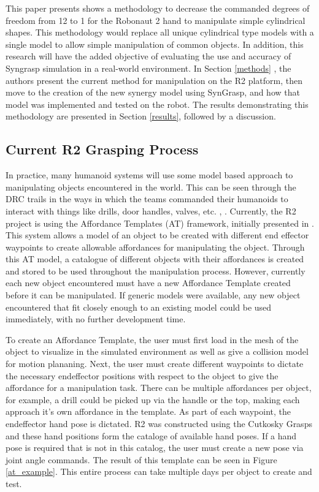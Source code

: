 \documentclass[letterpaper, 10 pt, conference]{ieeeconf}  %
\begin{document}
This paper presents shows a methodology to decrease the commanded degrees of freedom from 12 to 1 for the Robonaut 2 hand to manipulate simple cylindrical shapes. This methodology would replace all unique cylindrical type models with a single model to allow simple manipulation of common objects. In addition, this research will have the added objective of evaluating the use and accuracy of Syngrasp simulation in a real-world environment. In Section \ref{methods} , the authors present the current method for manipulation on the R2 platform, then move to the creation of the new synergy model using SynGrasp, and how that model was implemented and tested on the robot. The results demonstrating this methodology are presented in Section \ref{results}, followed by a discussion. 


\subsection{Current R2 Grasping Process}

In practice, many humanoid systems will use some model based approach to manipulating objects encountered in the world. This can be seen through the DRC trails in the ways in which the teams commanded their humanoids to interact with things like drills, door handles, valves, etc. \cite{DRC_Yanco}, \cite{IHMC}. Currently, the R2 project is using the Affordance Templates (AT) framework, initially presented in \cite{affordance_templates}. This system allows a model of an object to be created with different end effector waypoints to create allowable affordances for manipulating the object. Through this AT model, a catalogue of different objects with their affordances is created and stored to be used throughout the manipulation process. However, currently each new object encountered must have a new Affordance Template created before it can be manipulated. If generic models were available, any new object encountered that fit closely enough to an existing model could be used immediately, with no further development time. 

To create an Affordance Template, the user must first load in the mesh of the object to visualize in the simulated environment as well as give a collision model for motion plananing. Next, the user must create different waypoints to dictate the necessary endeffector positions with respect to the object to give the affordance for a manipulation task. There can be multiple affordances per object, for example, a drill could be picked up via the handle or the top, making each approach it's own affordance in the template. As part of each waypoint, the endeffector hand pose is dictated. R2 was constructed using the Cutkosky Grasps \cite{Cutkosky} and these hand positions form the cataloge of available hand poses. If a hand pose is required that is not in this catalog, the user must create a new pose via joint angle commands. The result of this template can be seen in Figure \ref{at_example}. This entire process can take multiple days per object to create and test.
\end{document}
